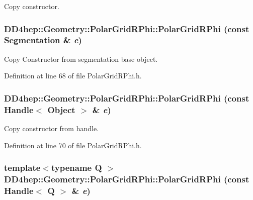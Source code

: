 Copy constructor. \hypertarget{class_d_d4hep_1_1_geometry_1_1_polar_grid_r_phi_aec8a817c925fdd0146eaf53c612e32e4}{
\subsubsection[{PolarGridRPhi}]{\setlength{\rightskip}{0pt plus 5cm}DD4hep::Geometry::PolarGridRPhi::PolarGridRPhi (const {\bf Segmentation} \& {\em e})}}
\label{class_d_d4hep_1_1_geometry_1_1_polar_grid_r_phi_aec8a817c925fdd0146eaf53c612e32e4}


Copy Constructor from segmentation base object. 

Definition at line 68 of file PolarGridRPhi.h.\hypertarget{class_d_d4hep_1_1_geometry_1_1_polar_grid_r_phi_ab27807b9812126c2574356c71dee5c15}{
\subsubsection[{PolarGridRPhi}]{\setlength{\rightskip}{0pt plus 5cm}DD4hep::Geometry::PolarGridRPhi::PolarGridRPhi (const {\bf Handle}$<$ {\bf Object} $>$ \& {\em e})}}
\label{class_d_d4hep_1_1_geometry_1_1_polar_grid_r_phi_ab27807b9812126c2574356c71dee5c15}


Copy constructor from handle. 

Definition at line 70 of file PolarGridRPhi.h.\hypertarget{class_d_d4hep_1_1_geometry_1_1_polar_grid_r_phi_a0a844c67b09ed51648cba4547348ab04}{
\subsubsection[{PolarGridRPhi}]{\setlength{\rightskip}{0pt plus 5cm}template$<$typename Q $>$ DD4hep::Geometry::PolarGridRPhi::PolarGridRPhi (const {\bf Handle}$<$ Q $>$ \& {\em e})}}
\label{class_d_d4hep_1_1_geometry_1_1_polar_grid_r_phi_a0a844c67b09ed51648cba4547348ab04}


